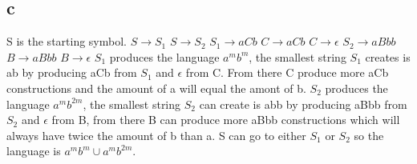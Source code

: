 \documentclass[12pt]{article}
\begin{document}
\subsection*{c} S is the starting symbol. \newline
$S \rightarrow S_1$ \newline
$S \rightarrow S_2$ \newline
$S_1 \rightarrow aCb$ \newline
$C \rightarrow aCb$ \newline
$C \rightarrow \epsilon $ \newline
$S_2 \rightarrow aBbb$ \newline
$B \rightarrow aBbb$ \newline
$B \rightarrow \epsilon $ \newline
$S_1$ produces the language $a^mb^m$, the smallest string $S_1$ creates is ab by producing aCb from $S_1$ and $\epsilon$ from C.  From there C produce more aCb constructions and the amount of a will equal the amont of b. $S_2$ produces the language $a^mb^{2m}$, the smallest string $S_2$ can create is abb by producing aBbb from $S_2$ and $\epsilon$ from B, from there B can produce more aBbb constructions which will always have twice the amount of b than a. S can go to either $S_1$ or $S_2$ so the language is $a^mb^m \cup a^mb^{2m}$.
\end{document}
